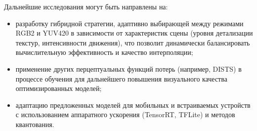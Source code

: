 Дальнейшие исследования могут быть направлены на:
\begin{itemize}
	\item разработку гибридной стратегии, адаптивно выбирающей между режимами RGB2 и YUV420 в зависимости от характеристик сцены (уровня детализации текстур, интенсивности движения), что позволит динамически балансировать вычислительную эффективность и качество интерполяции;
	\item применение других перцептуальных функций потерь (например, DISTS) в процессе обучения для дальнейшего повышения визуального качества оптимизированных моделей;
	\item адаптацию предложенных моделей для мобильных и встраиваемых устройств с использованием аппаратного ускорения (TensorRT, TFLite) и методов квантования.
\end{itemize}
